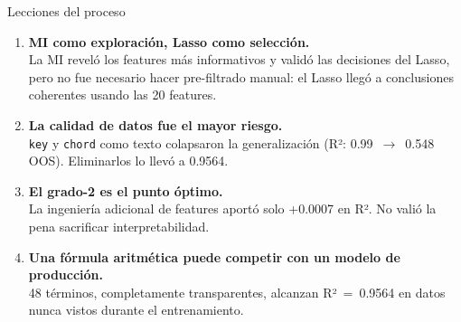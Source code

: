 \documentclass[aspectratio=169]{beamer}
\begin{document}
\begin{frame}{Lecciones del proceso}

  \begin{enumerate}
    \setlength{\itemsep}{8pt}

    \item \textbf{MI como exploración, Lasso como selección.}\\
    \small La MI reveló los features más informativos y validó las decisiones del Lasso, pero no fue necesario hacer pre-filtrado manual: el Lasso llegó a conclusiones coherentes usando las 20 features.

    \item \textbf{La calidad de datos fue el mayor riesgo.}\\
    \small \texttt{key} y \texttt{chord} como texto colapsaron la generalización (R²: 0.99~$\to$~0.548 OOS). Eliminarlos lo llevó a 0.9564.

    \item \textbf{El grado-2 es el punto óptimo.}\\
    \small La ingeniería adicional de features aportó solo +0.0007 en R². No valió la pena sacrificar interpretabilidad.

    \item \textbf{Una fórmula aritmética puede competir con un modelo de producción.}\\
    \small 48 términos, completamente transparentes, alcanzan R²~=~0.9564 en datos nunca vistos durante el entrenamiento.

  \end{enumerate}

\end{frame}
\end{document}
